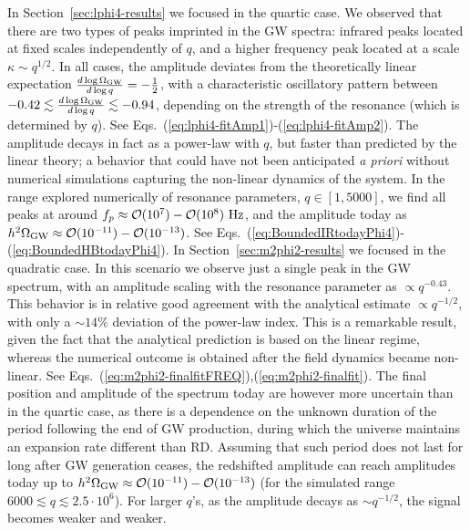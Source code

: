 \documentclass[a4paper,11pt]{article}
\begin{document}
In Section~\ref{sec:lphi4-results} we focused in the quartic case. We observed that there are two types of peaks imprinted in the GW spectra: infrared peaks located at fixed scales independently of $q$, and a higher frequency peak located at a scale $\kappa \sim q^{1/2}$. In all cases, the amplitude deviates from the theoretically linear expectation ${d\log\Omega_{\rm GW}\over d\log q} = -{1\over2}$, with a characteristic oscillatory pattern between $-0.42 \lesssim {d\log\Omega_{\rm GW}\over d\log q} \lesssim -0.94$, depending on the strength of the resonance (which is determined by $q$). See Eqs.~(\ref{eq:lphi4-fitAmp1})-(\ref{eq:lphi4-fitAmp2}). The amplitude decays in fact as a power-law with $q$, but faster than predicted by the linear theory; a behavior that could have not been anticipated {\it a priori} without numerical simulations capturing the non-linear dynamics of the system. In the range explored numerically of resonance parameters, $q \in [1, 5000]$, we find all peaks at around $f_p \approx \mathcal{O} (10^7) - \mathcal{O} (10^8) \ {\rm Hz}$, and the amplitude today as $h^2 \Omega_{\rm GW} \approx \mathcal{O} (10^{-11} ) - \mathcal{O} (10^{-13})$. See Eqs.~(\ref{eq:BoundedIRtodayPhi4})-(\ref{eq:BoundedHBtodayPhi4}). In Section~\ref{sec:m2phi2-results} we focused in the quadratic case. In this scenario we observe just a single peak in the GW spectrum, with an amplitude scaling with the resonance parameter as $\propto q^{-0.43}$. This behavior is in relative good agreement with the analytical estimate $\propto q^{-1/2}$, with only a $\sim 14\%$ deviation of the power-law index. This is a remarkable result, given the fact that the analytical prediction is based on the linear regime, whereas the numerical outcome is obtained after the field dynamics became non-linear. See Eqs.~(\ref{eq:m2phi2-finalfitFREQ}),(\ref{eq:m2phi2-finalfit}). The final position and amplitude of the spectrum today are however more uncertain than in the quartic case, as there is a dependence on the unknown duration of the period following the end of GW production, during which the universe maintains an expansion rate different than RD. Assuming that such period does not last for long after GW generation ceases, the redshifted amplitude can reach amplitudes today up to $h^2 \Omega_{\rm GW} \approx \mathcal{O}(10^{-11})-\mathcal{O}(10^{-13})$ (for the simulated range $6000 \lesssim q \lesssim 2.5 \cdot 10^6$). For larger $q$'s, as the amplitude decays as $\sim q^{-1/2}$, the signal becomes weaker and weaker.
\end{document}
